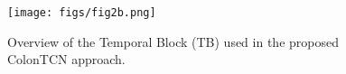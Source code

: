 \begin{figure}[t!]
\centering
\caption{Overview of the Temporal Block (TB) used in the proposed ColonTCN approach.}
\texttt{[image: figs/fig2b.png]}
\label{fig:fig2b}
\end{figure}
